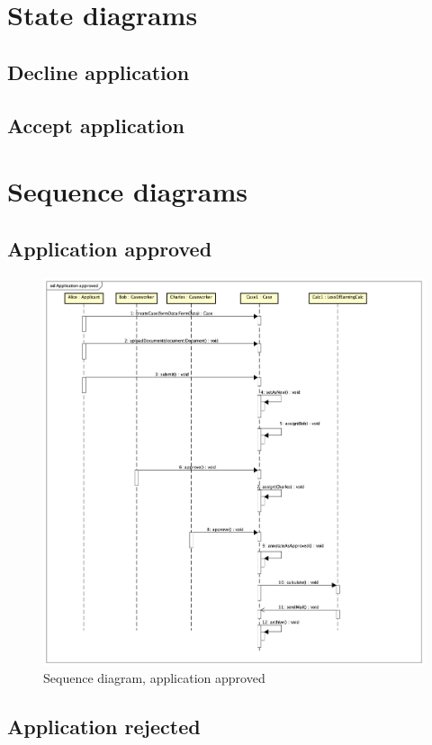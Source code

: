 \newpage
\section{State diagrams}

\subsection{Decline application}

\subsection{Accept application}

\section{Sequence diagrams}

\subsection{Application approved}

\begin{figure}[htb!]
    \centering
    \includegraphics[width=\textwidth]{img/sd-application-approved.png}
    \caption{Sequence diagram, application approved}
    \label{fig:my_label}
\end{figure}


\subsection{Application rejected}
